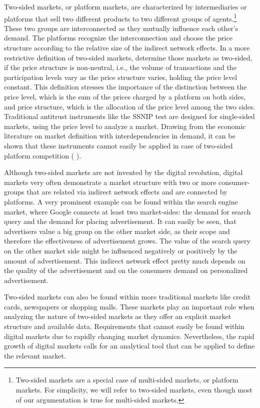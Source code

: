 \documentclass[12pt,a4paper]{scrreprt}
\begin{document}
Two-sided markets, or platform markets, are characterized by intermediaries or platforms that sell two different products to two different groups of agents.\footnote{Two-sided markets are a special case of multi-sided markets, or platform markets. For simplicity, we will refer to two-sided markets, even though most of our argumentation is true for multi-sided markets.} These two groups are interconnected as they mutually influence each other’s demand. The platforms recognize the interconnection and choose the price structure according to the relative size of the indirect network effects. In a more restrictive definition of two-sided markets, \cite{rochet_platform_2003} determine those markets as two-sided, if the price structure is non-neutral, i.e., the volume of transactions and the participation levels vary as the price structure varies, holding the price level constant. This definition stresses the importance of the distinction between the price level, which is the sum of the prices charged by a platform on both sides, and price structure, which is the allocation of the price level among the two sides. Traditional antitrust instruments like the SSNIP test are designed for single-sided markets, using the price level to analyze a market. Drawing from the economic literature on market definition with interdependencies in demand, it can be shown that these instruments cannot easily be applied in case of two-sided platform competition (\cite{noel_analyzing_2005} \cite{filistrucchi_market_2013}).

Although two-sided markets are not invented by the digital revolution, digital markets very often demonstrate a market structure with two or more consumer-groups that are related via indirect network effects and are connected by platforms. A very prominent example can be found within the search engine market, where Google connects at least two market-sides: the demand for search query and the demand for placing advertisement. It can easily be seen, that advertisers value a big group on the other market side, as their scope and therefore the effectiveness of advertisement grows. The value of the search query on the other market side might be influenced negatively or positively by the amount of advertisement. This indirect network effect pretty much depends on the quality of the advertisement and on the consumers demand on personalized advertisement.

Two-sided markets can also be found within more traditional markets like credit cards, newspapers or shopping malls. These markets play an important role when analyzing the nature of two-sided markets as they offer an explicit market structure and available data. Requirements that cannot easily be found within digital markets due to rapidly changing market dynamics. Nevertheless, the rapid growth of digital markets calls for an analytical tool that can be applied to define the relevant market.
\end{document}
